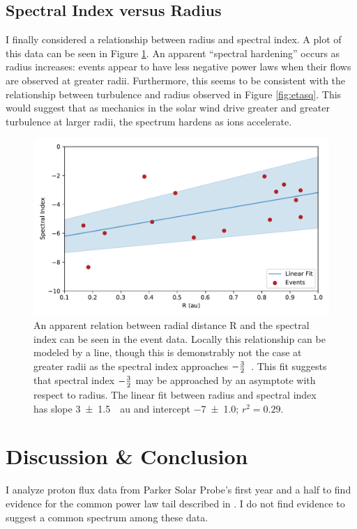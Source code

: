 \documentclass[letterpaper,11pt]{article}
\begin{document}
\subsection{Spectral Index versus Radius}
I finally considered a relationship between radius and spectral index.  A plot of this data can be seen in Figure \ref{fig:specidx_vs_R}.  An apparent ``spectral hardening'' occurs as radius increases: events appear to have less negative power laws when their flows are observed at greater radii.  Furthermore, this seems to be consistent with the relationship between turbulence and radius observed in Figure \ref{fig:etasq}.  This would suggest that as mechanics in the solar wind drive greater and greater turbulence at larger radii, the spectrum hardens as ions accelerate.

\begin{figure}[htbp]
\centering
\includegraphics[width=0.9\linewidth]{figures/specidx_vs_R.pdf}
\caption{An apparent relation between radial distance R and the spectral index can be seen in the event data.  Locally this relationship can be modeled by a line, though this is demonstrably not the case at greater radii as the spectral index approaches $-{3 \over 2}$~\citep{Fisk2008,Fisk2006,Schwadron2010,Schwadron2019AGU}.  This fit suggests that spectral index $-{3 \over 2}$ may be approached by an asymptote with respect to radius.  The linear fit between radius and spectral index has slope \SI{3 \pm 1.5}{\per \astronomicalunit} and intercept \SI{-7 \pm 1.0}{}; $r^2 = 0.29$.}
\label{fig:specidx_vs_R}
\end{figure}



\section{Discussion \& Conclusion}
\label{sec:conclusion}
I analyze proton flux data from Parker Solar Probe's first year and a half to find evidence for the common power law tail described in \citet{Fisk2006}.  I do not find evidence to suggest a common spectrum among these data.
\end{document}
